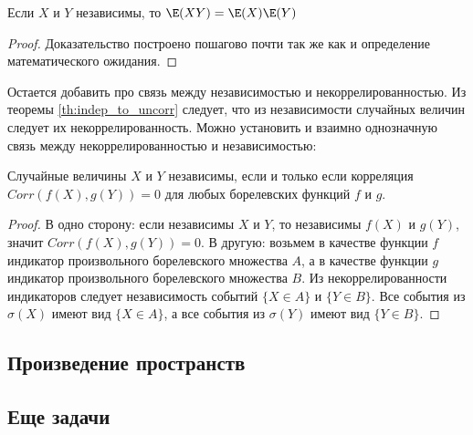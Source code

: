 {\begin{myth}
Если $X$ и $Y$ независимы, то $\E(XY)=\E(X)\E(Y)$
\end{myth}
\begin{proof}
Доказательство построено пошагово почти так же как и определение математического ожидания.

\end{proof}


Остается добавить про связь между независимостью и некоррелированностью. Из теоремы \ref{th:indep_to_uncorr} следует, что из независимости случайных величин следует их некоррелированность. Можно установить и взаимно однозначную связь между некоррелированностью и независимостью:

\begin{myth}
Случайные величины $X$ и $Y$ независимы, если и только если корреляция $Corr(f(X), g(Y))=0$ для любых борелевских функций $f$ и $g$.
\end{myth}
\begin{proof}
В одно сторону: если независимы $X$ и $Y$, то независимы $f(X)$ и $g(Y)$, значит $Corr(f(X),g(Y))=0$. В другую: возьмем в качестве функции $f$ индикатор произвольного борелевского множества $A$, а в качестве функции $g$ индикатор произвольного борелевского множества $B$. Из некоррелированности индикаторов следует независимость событий $\{X\in A\}$ и $\{Y\in B\}$. Все события из $\sigma(X)$ имеют вид $\{X\in A\}$, а все события из $\sigma(Y)$ имеют вид $\{Y\in B\}$.
\end{proof}



}\subsection{Произведение пространств} \subsection{Еще задачи}

